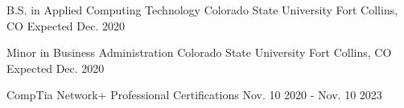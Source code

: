 



\begin{cventries}
  \cventry
    {B.S. in Applied Computing Technology} %
    {Colorado State University} %
    {Fort Collins, CO} %
    {Expected Dec. 2020} %
    {}

    \cventry
    {Minor in Business Administration} %
    {Colorado State University} %
    {Fort Collins, CO} %
    {Expected Dec. 2020} %
    {}

  \certentry
    {CompTia Network+} %
    {Professional Certifications} %
    {Nov. 10 2020 - Nov. 10 2023} %
	{ }
	{ }
\end{cventries}
